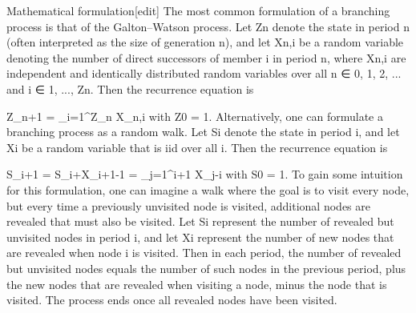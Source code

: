 Mathematical formulation[edit]
The most common formulation of a branching process is that of the Galton–Watson process. Let Zn denote the state in period n (often interpreted as the size of generation n), and let Xn,i be a random variable denoting the number of direct successors of member i in period n, where Xn,i are independent and identically distributed random variables over all n ∈{ 0, 1, 2, ...} and i ∈ {1, ..., Zn}. Then the recurrence equation is

Z_{n+1} = \sum_{i=1}^{Z_n} X_{n,i}
with Z0 = 1. Alternatively, one can formulate a branching process as a random walk. Let Si denote the state in period i, and let Xi be a random variable that is iid over all i. Then the recurrence equation is

S_{i+1} = S_i+X_{i+1}-1 = \sum_{j=1}^{i+1} X_j-i
with S0 = 1. To gain some intuition for this formulation, one can imagine a walk where the goal is to visit every node, but every time a previously unvisited node is visited, additional nodes are revealed that must also be visited. Let Si represent the number of revealed but unvisited nodes in period i, and let Xi represent the number of new nodes that are revealed when node i is visited. Then in each period, the number of revealed but unvisited nodes equals the number of such nodes in the previous period, plus the new nodes that are revealed when visiting a node, minus the node that is visited. The process ends once all revealed nodes have been visited.
